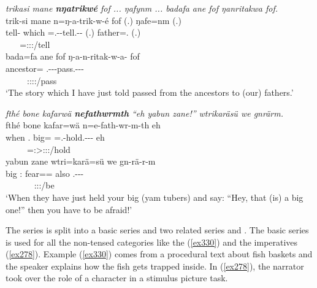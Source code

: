 \begin{exe}
	\ex \emph{trikasi mane \textbf{nŋatrikwé} fof ... ŋafynm ... badafa ane fof ŋanritakwa fof.}\\
	\glll trik-si mane n=ŋ-a-trik-w-é fof (.) ŋafe=nm (.)\\
	tell-{\Nmlz} which \Immpst=\M.\Alph-\Vc-tell.\Ext-\Ndu-\Fsg{} {\Emph} (.) father=\Dat.{\Nsg} (.)\\
	~ ~ {\footnotesize \Immpst=\Fsg:\Sbj:\Nonpast:\Ipfv/tell} ~ ~ ~ ~\\
	\sn
	\glll bada=fa ane fof ŋ-a-n-ritak-w-a-\Zero{} fof\\
	ancestor={\Abl} {\Dem} {\Emph} \M.\Alph-\Vc-\Venit-pass.\Ext-\Ndu-\Pst-{\Sg} {\Emph}\\
	~ ~ ~ {\footnotesize \Stsg:\Sbj:\Pst:\Ipfv:\Venit/pass} ~\\
	\trans `The story which I have just told passed from the ancestors to (our) fathers.'\\ 
	\label{ex273}
\end{exe}
\begin{exe}
	\ex \emph{fthé bone kafarwä \textbf{nefathwrmth} ``eh yabun zane!'' wtrikaräsü we gnrärm.}\\
	\glll fthé bone kafar=wä n=e-fath-wr-m-th eh\\
	when \Ssg.{\Poss} big={\Emph} \Immpst=\Stnsg.\Alph-hold.\Ext-\Ndu-\Dur-\Stnsg{} eh\\
	~ ~ ~ {\footnotesize \Immpst=\Stpl:\Sbj>\Stpl:\Obj:\Nonpast:\Dur/hold} ~\\
	\sn
	\glll yabun zane wtri=karä=sü we gn-rä-r-m\\
	big \Dem:{\Prox} fear=\Prop=\Etc{} also \Ssg.\Bet-\Cop-\Ndu-\Dur{}\\
	~ ~ ~ ~ {\footnotesize \Ssg:\Sbj:\Futimp:\Ipfv/be}\\
	\trans `When they have just held your big (yam tubers) and say: ``Hey, that (is) a big one!'' then you have to be afraid!' 
	\label{ex274}
\end{exe}

The \Bet{} series is split into a basic series \Bet{} and two related series \Betaone{} and \Betatwo. The basic \Bet{} series is used for all the non-tensed categories like the  (\ref{ex330}) and the imperatives (\ref{ex278}). Example (\ref{ex330}) comes from a procedural text about fish baskets and the speaker explains how the fish gets trapped inside. In (\ref{ex278}), the narrator took over the role of a character in a stimulus picture task.

